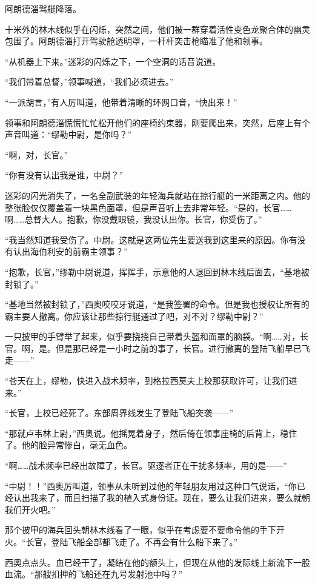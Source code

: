 \documentclass[AutoFakeBold=true]{book}
\begin{document}
阿朗德淄驾艇降落。

十米外的林木线似乎在闪烁，突然之间，他们被一群穿着活性变色龙聚合体的幽灵包围了。阿朗德淄打开驾驶舱透明罩，一杆杆突击枪瞄准了他和领事。

``从机器上下来。''迷彩的闪烁之下，一个空洞的话音说道。

``我们带着总督，''领事喊道，``我们必须进去。''

``一派胡言，''有人厉叫道，他带着清晰的环网口音，``快出来！''

领事和阿朗德淄慌慌忙忙松开他们的座椅约束器，刚要爬出来，突然，后座上有个声音叫道：``缪勒中尉，是你吗？''

``啊，对，长官。''

``你有没有认出我是谁，中尉？''

迷彩的闪光消失了，一名全副武装的年轻海兵就站在掠行艇的一米距离之内。他的整张脸仅仅覆盖着一块黑色面罩，但是声音听上去非常年轻。``是的，长官……啊……总督大人。抱歉，你没戴眼镜，我没认出你。长官，你受伤了。''

``我当然知道我受伤了。中尉。这就是这两位先生要送我到这里来的原因。你有没有认出海伯利安的前霸主领事？''

``抱歉，长官，''缪勒中尉说道，挥挥手，示意他的人退回到林木线后面去，``基地被封锁了。''

``基地当然被封锁了，''西奥咬咬牙说道，``是我签署的命令。但是我也授权让所有的霸主要人撤离。你应该让那些掠行艇通过了吧，对不对？缪勒中尉？''

一只披甲的手臂举了起来，似乎要挠挠自己带着头盔和面罩的脑袋。``啊……对，长官。啊，是。但是那已经是一小时之前的事了，长官。进行撤离的登陆飞船早已飞走——''

``苍天在上，缪勒，快进入战术频率，到格拉西莫夫上校那获取许可，让我们进来。''

``长官，上校已经死了。东部周界线发生了登陆飞船突袭——''

``那就卢韦林上尉，''西奥说。他摇晃着身子，然后倚在领事座椅的后背上，稳住了。他的脸异常惨白，毫无血色。

``啊……战术频率已经出故障了，长官。驱逐者正在干扰多频率，用的是——''

``中尉！！''西奥厉叫道，领事从未听到过他的年轻朋友用过这种口气说话，``你已经认出我来了，而且扫描了我的植入式身份证。现在，要么让我们进来，要么就朝我们开火吧。''

那个披甲的海兵回头朝林木线看了一眼，似乎在考虑要不要命令他的手下开火。``长官，登陆飞船全部都飞走了。不再会有什么船下来了。''

西奥点点头。血已经干了，凝结在他的额头上，但现在从他的发际线上新流下一股血流。``那艘扣押的飞船还在九号发射池中吗？''
\end{document}
